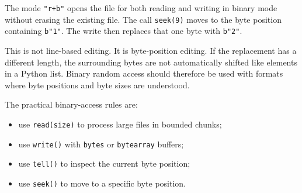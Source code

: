 The mode \texttt{"r+b"} opens the file for both reading and writing in binary mode without erasing the existing file. The call \texttt{seek(9)} moves to the byte position containing \texttt{b"1"}. The write then replaces that one byte with \texttt{b"2"}.

This is not line-based editing. It is byte-position editing. If the replacement has a different length, the surrounding bytes are not automatically shifted like elements in a Python list. Binary random access should therefore be used with formats where byte positions and byte sizes are understood.

The practical binary-access rules are:

\begin{itemize}
    \item use \texttt{read(size)} to process large files in bounded chunks;
    \item use \texttt{write()} with \texttt{bytes} or \texttt{bytearray} buffers;
    \item use \texttt{tell()} to inspect the current byte position;
    \item use \texttt{seek()} to move to a specific byte position.
\end{itemize}

